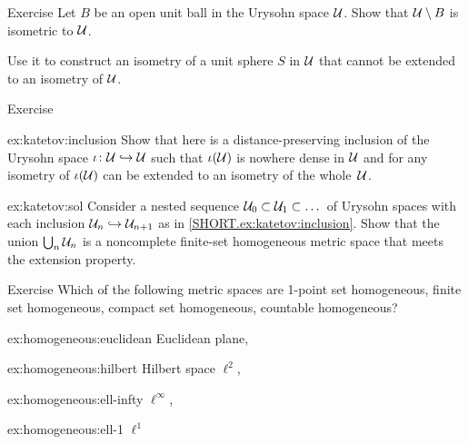 \begin{thm}{Exercise}\label{ex:ext(shere)}
Let $B$ be an open unit ball in the Urysohn space $\mathcal{U}$.
Show that $\mathcal{U}\setminus B$ is isometric to $\mathcal{U}$.

Use it to construct an isometry of a unit sphere $S$ in $\mathcal{U}$ that cannot be extended to an isometry of $\mathcal{U}$.
\end{thm}

\begin{thm}{Exercise}\label{ex:katetov}

\begin{subthm}{ex:katetov:inclusion}
Show that here is a distance-preserving inclusion of the Urysohn space $\iota\colon\mathcal{U}\hookrightarrow \mathcal{U}$ 
such that $\iota(\mathcal{U})$ is nowhere dense in $\mathcal{U}$ and for any isometry of $\iota(\mathcal{U})$ 
can be extended to an isometry of the whole~$\mathcal{U}$.
\end{subthm}

\begin{subthm}{ex:katetov:sol}
Consider a nested sequence $\mathcal{U}_0\subset \mathcal{U}_1\subset\dots$ of Urysohn spaces 
with each inclusion $\mathcal{U}_n\hookrightarrow \mathcal{U}_{n+1}$ as in \ref{SHORT.ex:katetov:inclusion}.
Show that the union $\bigcup_n\mathcal{U}_n$ is a noncomplete finite-set homogeneous metric space that meets the extension property.
\end{subthm}

\end{thm}

\begin{thm}{Exercise}\label{ex:homogeneous}
Which of the following metric spaces are 
1-point set homogeneous, finite set homogeneous, compact set homogeneous, countable homogeneous?

\begin{subthm}{ex:homogeneous:euclidean}
Euclidean plane,
\end{subthm}

\begin{subthm}{ex:homogeneous:hilbert}
 Hilbert space $\ell^2$,
\end{subthm}

\begin{subthm}{ex:homogeneous:ell-infty}
 $\ell^\infty$,
\end{subthm}

\begin{subthm}{ex:homogeneous:ell-1}
 $\ell^1$
\end{subthm}
\end{thm}


